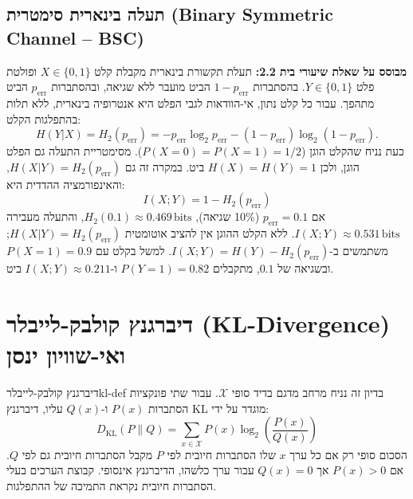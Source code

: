 \subsection{תעלה בינארית סימטרית (\texorpdfstring{\textenglish{Binary Symmetric Channel -- BSC}}{Binary Symmetric Channel - BSC})}
\textbf{מבוסס על שאלת שיעורי בית 2.2:}
תעלת תקשורת בינארית מקבלת קלט $X \in \{0, 1\}$ ופולטת פלט $Y \in \{0, 1\}$. בהסתברות $1-p_{\mathrm{err}}$ הביט מועבר ללא שגיאה, ובהסתברות $p_{\mathrm{err}}$ הביט מתהפך.
עבור כל קלט נתון, אי-הוודאות לגבי הפלט היא אנטרופיה בינארית, ללא תלות בהתפלגות הקלט:
\begin{equation}\label{eq:bsc-forward-entropy}
H(Y|X) = H_2(p_{\mathrm{err}}) = -p_{\mathrm{err}}\log_2 p_{\mathrm{err}} - (1-p_{\mathrm{err}})\log_2(1-p_{\mathrm{err}}).
\end{equation}
כעת נניח שהקלט הוגן ($P(X=0)=P(X=1)=1/2$). מסימטריית התעלה גם הפלט הוגן, ולכן $H(X)=H(Y)=1$ ביט. במקרה זה גם $H(X|Y)=H_2(p_{\mathrm{err}})$, והאינפורמציה ההדדית היא:
\begin{equation}\label{eq:bsc-mi}
\boxed{I(X; Y) = 1 - H_2(p_{\mathrm{err}})}
\end{equation}
אם $p_{\mathrm{err}} = 0.1$ (10\% שגיאה), $H_2(0.1) \approx 0.469\,\text{bits}$, והתעלה מעבירה $I(X;Y) \approx 0.531\,\text{bits}$.
ללא הקלט ההוגן אין להציב אוטומטית $H(X|Y)=H_2(p_{\mathrm{err}})$; משתמשים ב-$I(X;Y)=H(Y)-H_2(p_{\mathrm{err}})$. למשל בקלט עם $P(X=1)=0.9$ ובשגיאה של $0.1$, מתקבלים $P(Y=1)=0.82$ ו-$I(X;Y)\approx0.211$ ביט.

\section{דיברגנץ קולבק-לייבלר (\texorpdfstring{\textenglish{KL-Divergence}}{KL-Divergence}) ואי-שוויון ינסן}\label{sec:kl-divergence}

\begin{definition}{דיברגנץ קולבק-לייבלר}{kl-def}
בדיון זה נניח מרחב מדגם בדיד סופי $\mathcal{X}$. עבור שתי פונקציות הסתברות $P(x)$ ו-$Q(x)$ עליו, דיברגנץ KL מוגדר על ידי:
\begin{equation}\label{eq:kl-def}
\boxed{D_{\mathrm{KL}}(P \parallel Q) = \sum_{x \in \mathcal{X}} P(x) \log_2 \left(\frac{P(x)}{Q(x)}\right)}
\end{equation}
הסכום סופי רק אם כל ערך $x$ שלו הסתברות חיובית לפי $P$ מקבל הסתברות חיובית גם לפי $Q$. אם $P(x)>0$ אך $Q(x)=0$ עבור ערך כלשהו, הדיברגנץ אינסופי. קבוצת הערכים בעלי הסתברות חיובית נקראת התמיכה של ההתפלגות.
\end{definition}

